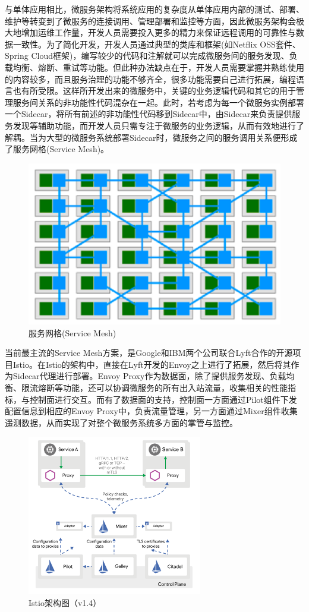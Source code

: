 \documentclass[12pt,a4paper]{article}
\begin{document}
与单体应用相比，微服务架构将系统应用的复杂度从单体应用内部的测试、部署、维护等转变到了微服务的连接调用、管理部署和监控等方面，因此微服务架构会极大地增加运维工作量，开发人员需要投入更多的精力来保证远程调用的可靠性与数据一致性。为了简化开发，开发人员通过典型的类库和框架(如Netflix OSS套件、Spring Cloud框架)，编写较少的代码和注解就可以完成微服务间的服务发现、负载均衡、熔断、重试等功能。但此种办法缺点在于，开发人员需要掌握并熟练使用的内容较多，而且服务治理的功能不够齐全，很多功能需要自己进行拓展，编程语言也有所受限。这样所开发出来的微服务中，关键的业务逻辑代码和其它的用于管理服务间关系的非功能性代码混杂在一起。此时，若考虑为每一个微服务实例部署一个Sidecar，将所有前述的非功能性代码移到Sidecar中，由Sidecar来负责提供服务发现等辅助功能，而开发人员只需专注于微服务的业务逻辑，从而有效地进行了解耦。当为大型的微服务系统部署Sidecar时，微服务之间的服务调用关系便形成了服务网格(Service Mesh)。
\begin{figure}[ht]
 \centering
 \includegraphics[]{images/service_mesh.png}
 \caption{服务网格(Service Mesh)}
 \label{fig:service_mesh}
\end{figure}

当前最主流的Service Mesh方案，是Google和IBM两个公司联合Lyft合作的开源项目Istio。在Istio的架构中，直接在Lyft开发的Envoy之上进行了拓展，然后将其作为Sidecar代理进行部署。Envoy Proxy作为数据面，除了提供服务发现、负载均衡、限流熔断等功能，还可以协调微服务的所有出入站流量，收集相关的性能指标，与控制面进行交互。而有了数据面的支持，控制面一方面通过Pilot组件下发配置信息到相应的Envoy Proxy中，负责流量管理，另一方面通过Mixer组件收集遥测数据，从而实现了对整个微服务系统多方面的掌管与监控。
\begin{figure}[ht]
 \centering
 \includegraphics[height=7cm]{images/istio_arch.png}
 \caption{Istio架构图（v1.4）}
 \label{fig:istio_arch}
\end{figure}
\end{document}
